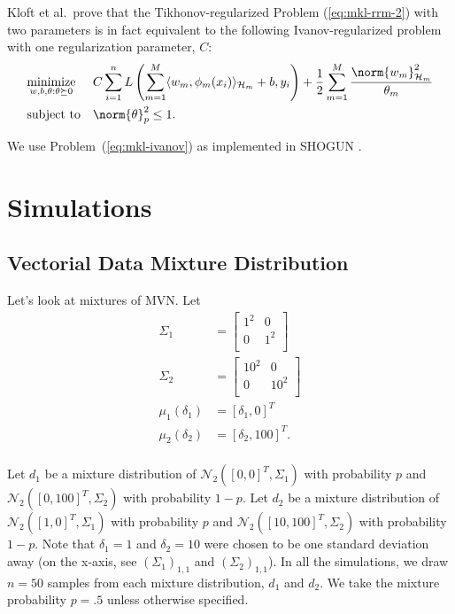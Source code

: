 Kloft et al.\ prove that the Tikhonov-regularized Problem (\ref{eq:mkl-rrm-2})
with two parameters is in fact equivalent to the following Ivanov-regularized
problem with one regularization parameter, $C$:
\begin{equation}
\label{eq:mkl-ivanov}
\begin{aligned}
& \underset{w, b, \theta : \theta \succeq 0}{\text{minimize}}
& & C \sum_{i=1}^n L \left (\sum_{m=1}^M \langle w_m, \phi_m(x_i) \rangle_{\mathcal{H}_m} + b, y_i
\right) + \frac{1}{2} \sum_{m=1}^M \frac{\norm{w_m}_{\mathcal{H}_m}^2}{\theta_m} \\
& \text{subject to}
& & \norm{\theta}_p^2 \leq 1.
\end{aligned}
\end{equation}

We use Problem~(\ref{eq:mkl-ivanov}) as implemented in SHOGUN \cite{sonnenburg2010shogun}.

\section{Simulations}
\subsection{Vectorial Data Mixture Distribution}
Let's look at mixtures of MVN.  Let
\begin{align*}
  \Sigma_1 &=
  \begin{bmatrix}
    1^2 & 0   \\
    0   & 1^2 \\
  \end{bmatrix} \\
  \Sigma_2 &=
  \begin{bmatrix}
    10^2 & 0   \\
    0    & 10^2 \\
  \end{bmatrix} \\
  \mu_1(\delta_1) &= [\delta_1, 0]^T \\
  \mu_2(\delta_2) &= [\delta_2, 100]^T. \\
\end{align*}

Let $d_1$ be a mixture distribution of $\mathcal{N}_2([0, 0]^T, \Sigma_1)$ with
probability $p$ and $\mathcal{N}_2([0, 100]^T, \Sigma_2)$ with
probability $1-p$.  Let $d_2$ be a mixture distribution of
$\mathcal{N}_2([1, 0]^T, \Sigma_1)$ with probability $p$ and
$\mathcal{N}_2([10, 100]^T, \Sigma_2)$ with probability $1-p$.  Note
that $\delta_1 = 1$ and $\delta_2 = 10$ were chosen to be one standard
deviation away (on the x-axis, see $(\Sigma_1)_{1,1}$ and
$(\Sigma_2)_{1,1}$).  In all the simulations, we draw $n = 50$ samples
from each mixture distribution, $d_1$ and $d_2$.  We take the mixture
probability $p = .5$ unless otherwise specified.

